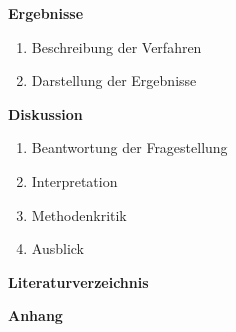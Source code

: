 \textbf{Ergebnisse}\par
\begin{enumerate}
    \item Beschreibung der Verfahren 
    \item Darstellung der Ergebnisse
\end{enumerate}

\textbf{Diskussion}\par
\begin{enumerate}
    \item Beantwortung der Fragestellung
    \item Interpretation
    \item Methodenkritik
    \item Ausblick
\end{enumerate}

\textbf{Literaturverzeichnis}\par

\textbf{Anhang}\par
